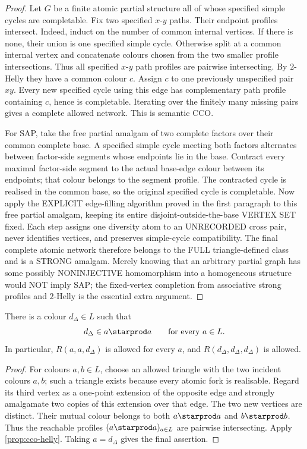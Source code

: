 \begin{proof}
Let \(G\) be a finite atomic partial structure all of whose specified simple
cycles are completable.  Fix two specified \(x\)-\(y\) paths.  Their endpoint
profiles intersect.  Indeed, induct on the number of common internal vertices.
If there is none, their union is one specified simple cycle.  Otherwise split
at a common internal vertex and concatenate colours chosen from the two smaller
profile intersections.  Thus all specified \(x\)-\(y\) path profiles are
pairwise intersecting.  By \(2\)-Helly they have a common colour \(c\).
Assign \(c\) to one previously unspecified pair \(xy\).  Every new specified
cycle using this edge has complementary path profile containing \(c\), hence is
completable.  Iterating over the finitely many missing pairs gives a complete
allowed network.  This is semantic CCO.

For SAP, take the free partial amalgam of two complete factors over their common
complete base.  A specified simple cycle meeting both factors alternates
between factor-side segments whose endpoints lie in the base.  Contract every
maximal factor-side segment to the actual base-edge colour between its
endpoints; that colour belongs to the segment profile.  The contracted cycle
is realised in the common base, so the original specified cycle is
completable. Now apply the EXPLICIT edge-filling algorithm proved
in the first paragraph to this free partial amalgam, keeping its
entire disjoint-outside-the-base VERTEX SET fixed. Each step assigns
one diversity atom to an UNRECORDED cross pair, never identifies
vertices, and preserves simple-cycle compatibility. The final
complete atomic network therefore belongs to the FULL
triangle-defined class and is a STRONG amalgam.
Merely knowing that an arbitrary partial graph has some possibly
NONINJECTIVE homomorphism into a homogeneous structure would
NOT imply SAP; the fixed-vertex completion from associative
strong profiles and $2$-Helly is the essential extra argument.
\end{proof}

\begin{lemma}\label{lem:universal-diagonal}
There is a colour \(d_\Delta\in L\) such that
\[
 d_\Delta\in a\starprod a
 \qquad\text{for every }a\in L.
\]
In particular, \(R(a,a,d_\Delta)\) is allowed for every \(a\), and
\(R(d_\Delta,d_\Delta,d_\Delta)\) is allowed.
\end{lemma}

\begin{proof}
For colours \(a,b\in L\), choose an allowed triangle with the two incident
colours \(a,b\); such a triangle exists because every atomic fork is
realisable.  Regard its third vertex as a one-point extension of the opposite
edge and strongly amalgamate two copies of this extension over that edge.
The two new vertices are distinct.  Their mutual colour belongs to both
\(a\starprod a\) and \(b\starprod b\).  Thus the reachable profiles
\((a\starprod a)_{a\in L}\) are pairwise intersecting.  Apply
\cref{prop:cco-helly}.  Taking \(a=d_\Delta\) gives the final assertion.
\end{proof}

